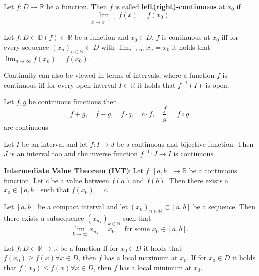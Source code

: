\begin{definition}
    Let $f: D \to \mathbb{R}$ be a function. Then $f$ is called \textbf{left(right)-continuous} at $x_0$ if
    $$\lim_{x \to x_0^{-(+)}} f(x) = f(x_0)$$
\end{definition}

\begin{theorem}
    Let $f: D \subset \mathbb{D}(f) \subset \mathbb{R}$ be a function and $x_0 \in D$. $f$ is continuous at $x_0$ iff for every sequence $(x_n)_{n\in\mathbb{N}} \subset D$ with $\lim_{n\to\infty} x_n = x_0$ it holds that $\lim_{n\to\infty} f(x_n) = f(x_0)$.
\end{theorem}

\begin{remark}
    Continuity can also be viewed in terms of intervals, where a function $f$ is continuous iff for every open interval $I \subset \mathbb{R}$ it holds that $f^{-1}(I)$ is open.
\end{remark}

\begin{lemma}
    Let $f, g$ be continuous functions then
    $$f+g, \quad f-g, \quad f \cdot g, \quad c \cdot f, \quad \frac{f}{g}, \quad f \circ g$$
    are continuous
\end{lemma}

\begin{theorem}
    Let $I$ be an interval and let $f: I \to J$ be a continuous and bijective function. Then $J$ is an interval too and the inverse function $f^{-1}: J \to I$ is continuous.
\end{theorem}

\begin{theorem}
    \textbf{Intermediate Value Theorem (IVT)}: Let $f: [a, b] \to \mathbb{R}$ be a continuous function. Let $c$ be a value between $f(a)$ and $f(b)$. Then there exists a $x_0 \in [a, b]$ such that $f(x_0) = c$.
\end{theorem}

\begin{lemma}
    Let $[a, b]$ be a compact interval and let $(x_n)_{n\in\mathbb{N}} \subset [a, b]$ be a sequence. Then there exists a subsequence $(x_{n_k})_{k\in\mathbb{N}}$ such that 
    $$ \lim_{k\to\infty} x_{n_k} = x_0 \quad \text{ for some } x_0 \in [a, b]. $$
\end{lemma}

\begin{definition}
    Let $f: D \subset \mathbb{R} \to \mathbb{R}$ be a function
    If for $x_0 \in D$ it holds that $f(x_0) \geq f(x) \forall x \in D$, then $f$ has a local maximum at $x_0$.
    If for $x_0 \in D$ it holds that $f(x_0) \leq f(x) \forall x \in D$, then $f$ has a local minimum at $x_0$.
\end{definition}

